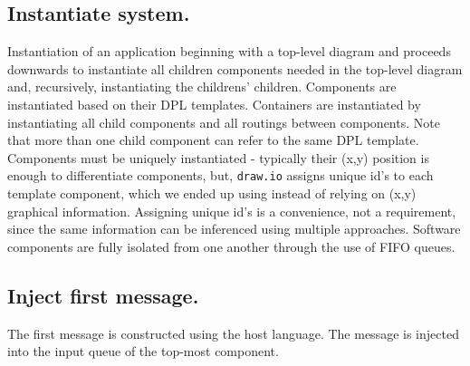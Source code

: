 \documentclass[10pt,anonymous,review]{acmart}
\begin{document}
\subsection{Instantiate system.}

  Instantiation\cite{run} of an application beginning with a top-level diagram
and proceeds downwards to instantiate all children components needed in
the top-level diagram and, recursively, instantiating the childrens'
children. Components are instantiated based on their DPL templates.
Containers are instantiated by instantiating all child components and
all routings between components. Note that more than one child component
can refer to the same DPL template. Components must be uniquely
instantiated - typically their (x,y) position is enough to differentiate
components, but, \texttt{draw.io} assigns unique
id's to each template component, which we ended up using instead of
relying on (x,y) graphical information. Assigning unique id's is a
convenience, not a requirement, since the same information can be inferenced 
using multiple approaches.
Software components are fully isolated from one another through the use
of FIFO queues.

\subsection{Inject first message.}

The first message is constructed using the host language. The message is
injected\cite{main} into the input queue of the top-most component.
%
  
\end{document}
